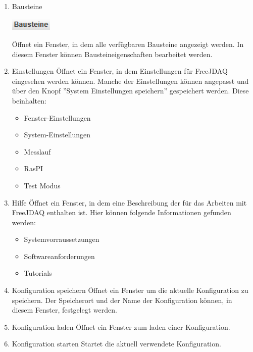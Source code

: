 \documentclass[parskip=full]{scrartcl}
\begin{document}
\begin{enumerate}
    \item Bausteine
    \begin{flushleft}
        \includegraphics[width = 2cm]{Grafiken/1-Bausteine.png}
    \end{flushleft}

    Öffnet ein Fenster, in dem alle verfügbaren Bausteine angezeigt werden. In diesem Fenster können Bausteineigenschaften bearbeitet werden.
    
    \item Einstellungen
    Öffnet ein Fenster, in dem Einstellungen für FreeJDAQ eingesehen werden können. Manche der Einstellungen können angepasst und über den Knopf ''System Einstellungen speichern'' gespeichert werden. Diese beinhalten:
    \begin{itemize}
        \item Fenster-Einstellungen
        \item System-Einstellungen
        \item Messlauf
        \item RasPI
        \item Test Modus
    \end{itemize}
    
    \item Hilfe
    Öffnet ein Fenster, in dem eine Beschreibung der für das Arbeiten mit FreeJDAQ enthalten ist. Hier können folgende Informationen gefunden werden:
    \begin{itemize}
        \item Systemvorraussetzungen
        \item Softwareanforderungen
        \item Tutorials
    \end{itemize}

    \item Konfiguration speichern
    Öffnet ein Fenster um die aktuelle Konfiguration zu speichern. Der Speicherort und der Name der Konfiguration können, in diesem Fenster, festgelegt werden.
    
    \item Konfiguration laden
    Öffnet ein Fenster zum laden einer Konfiguration.
    
    \item Konfiguration starten
    Startet die aktuell verwendete Konfiguration.
    

\end{enumerate}
\end{document}
